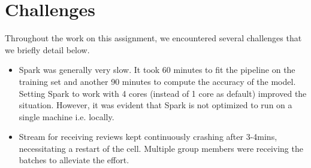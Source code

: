 \documentclass[11pt, oneside]{article}   	%
\begin{document}
	\section{Challenges}
	
	Throughout the work on this assignment, we encountered several challenges that we briefly detail below.
	\begin{itemize}
		
		\item Spark was generally very slow. It took 60 minutes to fit the pipeline on the training set and another 90 minutes to compute the accuracy of the model. Setting Spark to work with 4 cores (instead of 1 core as default) improved the situation. However, it was evident that Spark is not optimized to run on a single machine i.e. locally.
		\item Stream for receiving reviews kept continuously crashing after 3-4mins, necessitating a restart of the cell. Multiple group members were receiving the batches to alleviate the effort.
		
	\end{itemize}
	
\end{document}
